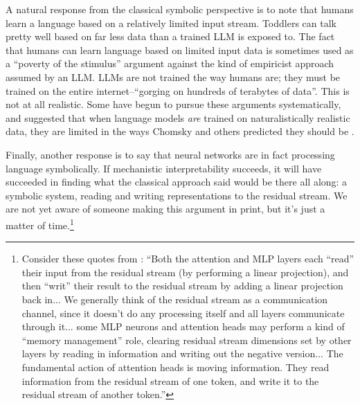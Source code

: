 A natural response from the classical symbolic perspective is to note that humans learn a language based on a relatively limited input stream. Toddlers can talk pretty well based on  far less data than a trained LLM is exposed to. The fact that humans can learn language based on limited input data is sometimes used as a ``poverty of the stimulus'' argument against the kind of empiricist approach assumed by an LLM.  LLMs are not trained the way humans are; they must be trained on the entire internet--``gorging on hundreds of terabytes of data''.  This is not at all realistic. Some have begun to pursue these arguments systematically, and suggested that when language models \emph{are} trained on naturalistically realistic data, they are limited in the ways Chomsky and others predicted they should be \cite{lan2024large}.

Finally, another response is to say that neural networks are in fact processing language symbolically. If mechanistic interpretability succeeds, it will have succeeded in finding what the classical approach said would be there all along: a  symbolic system, reading and writing representations to the residual stream. We are not yet aware of someone making this argument in print, but it's just a matter of time.\footnote{Consider these quotes from \cite{elhage2021mathematical}: ``Both the attention and MLP layers each ``read'' their input from the residual stream (by performing a linear projection), and then ``writ'' their result to the residual stream by adding a linear projection back in... We generally think of the residual stream as a communication channel, since it doesn't do any processing itself and all layers communicate through it... some MLP neurons and attention heads may perform a kind of ``memory management'' role, clearing residual stream dimensions set by other layers by reading in information and writing out the negative version... The fundamental action of attention heads is moving information. They read information from the residual stream of one token, and write it to the residual stream of another token.''}

